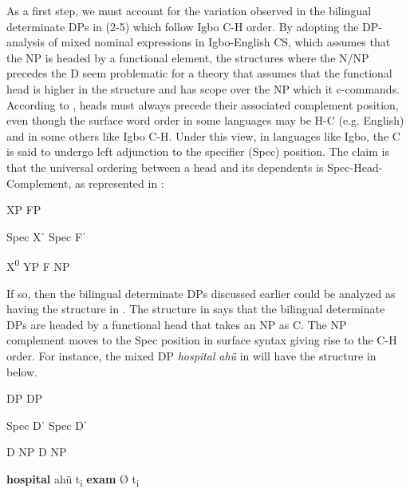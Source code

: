 \documentclass[output=paper]{langsci/langscibook}
\begin{document}
As a first step, we must account for the variation observed in the bilingual determinate DPs in (2-5) which follow Igbo C-H order. By adopting the DP-analysis of mixed nominal expressions in Igbo-English CS, which assumes that the NP is headed by a functional element, the structures where the N/NP precedes the D seem problematic for a theory that assumes that the functional head is higher in the structure and has scope over the NP which it c-commands. According to \citet{Kayne1994}, heads must always precede their associated complement position, even though the surface word order in some languages may be H-C (e.g. English) and in some others like Igbo C-H. Under this view, in languages like Igbo, the C is said to undergo left adjunction to the specifier (Spec) position. The claim is that the universal ordering between a head and its dependents is Spec-Head-Complement, as represented in :

\ea%
    \label{ex:14}
 

	      XP          FP

Spec    Xˈ      Spec    Fˈ

      X\textsuperscript{0    }YP      F    NP        
\z

If so, then the bilingual determinate DPs discussed earlier could be analyzed as having the structure in . The structure in  says that the bilingual determinate DPs are headed by a functional head that takes an NP as C. The NP complement moves to the Spec position in surface syntax giving rise to the C-H order. For instance, the mixed DP \textit{hospital}\textbf{\textit{ }}\textit{ahü} in  will have the structure in  below.

\ea%

	    DP            DP

  Spec       Dˈ      Spec      Dˈ

      D    NP        D    NP
\z

         \textbf{hospital}            ahü     t\textsubscript{i    }\textbf{exam    }Ø    t\textsubscript{i}
\end{document}
